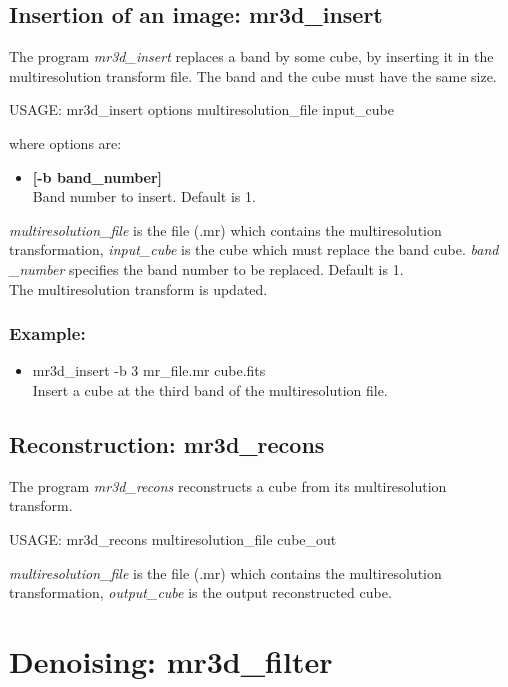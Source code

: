 \subsection{Insertion of an image: mr3d\_insert}
The program
{\em mr3d\_insert} replaces a band by some cube, by inserting it
in the multiresolution transform file. The band and the cube
must have the same size. 
{\bf
\begin{center}
 USAGE: mr3d\_insert options multiresolution\_file input\_cube
\end{center}}
where options are:
\begin{itemize}
\itemsep=0.1truecm
\item  {\bf  [-b band\_number] } \\
 Band number to insert. Default is 1.
\end{itemize}
{\em multiresolution\_file} is the file (.mr) which contains 
the multiresolution transformation, {\em input\_cube} is the cube
which must replace the band cube. {\em band \_number} specifies
the band  number to be replaced. Default is 1. \\
The multiresolution transform is updated. \\
\subsubsection*{Example:}
\begin{itemize}
\item mr3d\_insert -b 3 mr\_file.mr cube.fits \\
Insert a cube at the third band of the multiresolution file. 
\end{itemize}

\subsection{Reconstruction: mr3d\_recons}
The program 
{\em mr3d\_recons}  reconstructs a cube from its multiresolution
transform.
{\bf
\begin{center}
 USAGE: mr3d\_recons  multiresolution\_file  cube\_out
\end{center}}
{\em multiresolution\_file} is the file (.mr) which contains 
the multiresolution transformation, {\em output\_cube} is  the
output reconstructed cube.


\section{ Denoising: mr3d\_filter}
